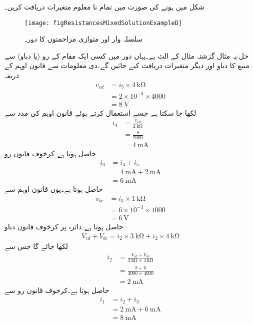 
شکل  میں  ہونے کی صورت میں تمام نا معلوم متغیرات دریافت کریں۔

\begin{figure}
\centering
\texttt{[image: figResistancesMixedSolutionExampleD]}
\caption{سلسلہ وار اور متوازی مزاحمتوں کا دور۔}
\label{شکل_مزاحمتی_دور_کا_حل}
\end{figure}

حل:یہ مثال گزشتہ مثال کے الٹ ہے۔یہاں دور میں کسی ایک مقام کے رو (یا دباو) سے منبع کا دباو اور دیگر متغیرات دریافت کیے جائیں گے۔دی معلومات سے قانون اوہم کے ذریعہ
\begin{align*}
v_{cd}&=i_5 \times \SI{4}{\kilo\ohm}\\
&=2\times 10^{-3}\times 4000\\
&=\SI{8}{\volt}
\end{align*}
لکھا جا سکتا ہے جسے استعمال کرتے ہوئے قانون اوہم کی مدد سے
\begin{align*}
i_4&=\frac{v_{cd}}{\SI{2}{\kilo\ohm}}\\
&=\frac{8}{2000}\\
&=\SI{4}{\milli\ampere}
\end{align*}
حاصل ہوتا ہے۔کرخوف قانون رو 
\begin{align*}
i_3&=i_4+i_5\\
&=\SI{4}{\milli\ampere}+\SI{2}{\milli\ampere}\\
&=\SI{6}{\milli\ampere}
\end{align*}
حاصل ہوتا ہے۔یوں قانون اوہم سے
\begin{align*}
v_{bc}&=i_3 \times \SI{1}{\kilo\ohm}\\
&=6\times 10^{-3} \times 1000\\
&=\SI{6}{\volt}
\end{align*}
حاصل ہوتا ہے۔دائرہ  پر کرخوف قانون دباو
\begin{align*}
V_{cd}+V_{bc}=i_2 \times \SI{3}{\kilo\ohm}+i_2\times \SI{4}{\kilo\ohm}
\end{align*}
لکھا جائے گا جس سے
\begin{align*}
i_2&=\frac{V_{cd}+V_{bc}}{\SI{3}{\kilo\ohm}+\SI{4}{\kilo\ohm}}\\
&=\frac{8+6}{3000+4000}\\
&=\SI{2}{\milli\ampere}
\end{align*}
حاصل ہوتا ہے۔کرخوف قانون رو سے
\begin{align*}
i_1&=i_2+i_3\\
&=\SI{2}{\milli\ampere}+\SI{6}{\milli\ampere}\\
&=\SI{8}{\milli\ampere}
\end{align*}
